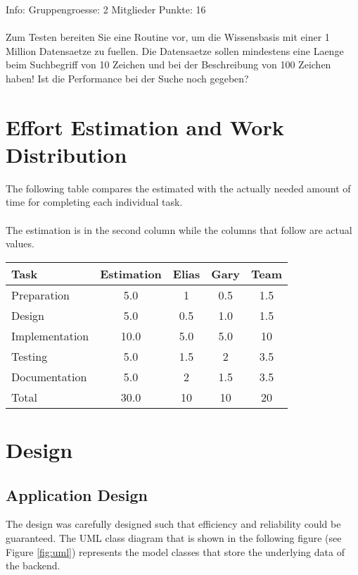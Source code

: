 \documentclass[11pt, a4paper]{article}
\begin{document}
Info: Gruppengroesse: 2 Mitglieder Punkte: 16
\\\\
Zum Testen bereiten Sie eine Routine vor, um die Wissensbasis mit einer 1
Million Datensaetze zu fuellen. Die Datensaetze sollen mindestens eine Laenge
beim Suchbegriff von 10 Zeichen und bei der Beschreibung von 100 Zeichen haben!
Ist die Performance bei der Suche noch gegeben?

\section{Effort Estimation and Work Distribution}

The following table compares the estimated with the actually needed
amount of time for completing each individual task.
\\\\
The estimation is in the second column while the columns that follow
are actual values.

\parskip 12pt
\begin{tabular} {| l | c | c | c | c |}
	\hline
	Task & Estimation & Elias & Gary & Team	\\ \hline \hline
	Preparation & 5.0 & 1 &  0.5 & 1.5		\\ \hline
	Design & 5.0  & 0.5 &	1.0  & 1.5			\\ \hline
	Implementation & 10.0 & 5.0 & 5.0 & 10 \\ \hline
	Testing & 5.0	& 1.5	& 2 & 3.5 \\ \hline
	Documentation	& 5.0 & 2 & 1.5 & 3.5	\\ \hline 
	Total	& 30.0	& 10 & 10 & 20 \\
	\hline
\end{tabular}

\section{Design}

\subsection{Application Design}

The design was carefully designed such that efficiency and reliability could be
guaranteed. The UML class diagram that is shown in the following figure (see
Figure \ref{fig:uml}) represents the model classes that store the underlying
data of the backend. 

\end{document}

